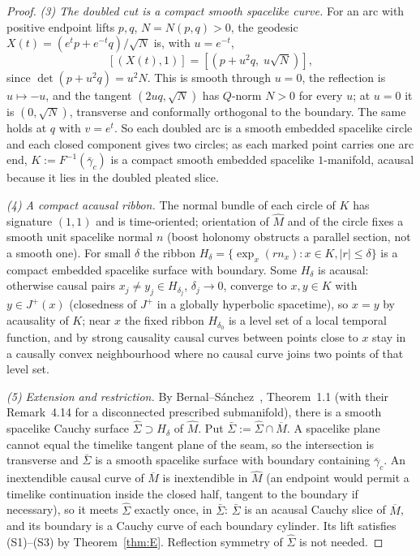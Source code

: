 \documentclass[aps,prd,onecolumn,superscriptaddress,nofootinbib,amsmath,amssymb,11pt]{revtex4-2}
\theoremstyle{definition}
\newcommand{\Mbar}{\overline{M}}
\begin{document}
\begin{proof}
\emph{(3) The doubled cut is a compact smooth spacelike curve.} For an arc with positive endpoint lifts $p,q$, $N=N(p,q)>0$, the
geodesic $X(t)=(e^tp+e^{-t}q)/\sqrt N$ is, with $u=e^{-t}$,
\begin{equation}\label{eq:arcchart}
[(X(t),1)]=[(p+u^2q,\;u\sqrt N)],
\end{equation}
since $\det(p+u^2q)=u^2N$. This is smooth through $u=0$, the reflection is $u\mapsto-u$, and the tangent $(2uq,\sqrt N)$ has
$Q$-norm $N>0$ for every $u$; at $u=0$ it is $(0,\sqrt N)$, transverse and conformally orthogonal to the boundary. The same holds at
$q$ with $v=e^t$. So each doubled arc is a smooth embedded spacelike circle and each closed component gives two circles; as each
marked point carries one arc end, $K:=F^{-1}(\bar\gamma_c)$ is a compact smooth embedded spacelike $1$-manifold, acausal because it
lies in the doubled pleated slice.

\emph{(4) A compact acausal ribbon.} The normal bundle of each circle of $K$ has signature $(1,1)$ and is time-oriented;
orientation of $\widehat M$ and of the circle fixes a smooth unit spacelike normal $n$ (boost holonomy obstructs a parallel section,
not a smooth one). For small $\delta$ the ribbon $H_\delta=\{\exp_x(rn_x):x\in K,|r|\le\delta\}$ is a compact embedded spacelike surface
with boundary. Some $H_\delta$ is acausal: otherwise causal pairs $x_j\ne y_j\in H_{\delta_j}$, $\delta_j\to0$, converge to $x,y\in K$ with
$y\in J^+(x)$ (closedness of $J^+$ in a globally hyperbolic spacetime), so $x=y$ by acausality of $K$; near $x$ the fixed ribbon
$H_{\delta_0}$ is a level set of a local temporal function, and by strong causality causal curves between points close to $x$ stay in
a causally convex neighbourhood where no causal curve joins two points of that level set.

\emph{(5) Extension and restriction.} By Bernal--S\'anchez~\cite{BernalSanchez2006}, Theorem~1.1 (with their Remark~4.14 for a
disconnected prescribed submanifold), there is a smooth spacelike Cauchy surface $\widehat\Sigma\supset H_\delta$ of $\widehat M$. Put
$\bar\Sigma:=\widehat\Sigma\cap\Mbar$. A spacelike plane cannot equal the timelike tangent plane of the seam, so the intersection is
transverse and $\bar\Sigma$ is a smooth spacelike surface with boundary containing $\bar\gamma_c$. An inextendible causal curve of
$\Mbar$ is inextendible in $\widehat M$ (an endpoint would permit a timelike continuation inside the closed half, tangent to the
boundary if necessary), so it meets $\widehat\Sigma$ exactly once, in $\bar\Sigma$: $\bar\Sigma$ is an acausal Cauchy slice of $\Mbar$,
and its boundary is a Cauchy curve of each boundary cylinder. Its lift satisfies (S1)--(S3) by Theorem~\ref{thm:E}. Reflection
symmetry of $\widehat\Sigma$ is not needed.


\end{proof}
\end{document}
